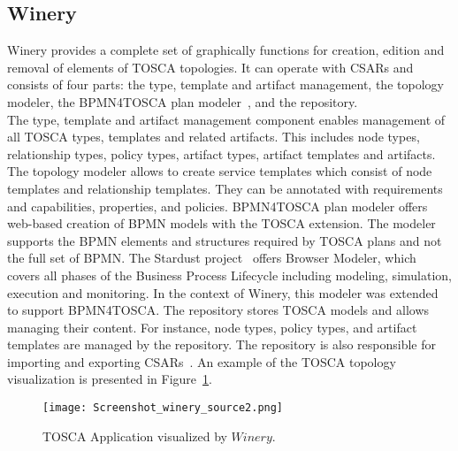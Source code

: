 \subsection*{Winery}\label{subs:wine}\label{tool:winery}
Winery provides a complete set of graphically functions for creation, edition and removal of elements of TOSCA topologies. 
It can operate with CSARs and consists of four parts: the type, template and artifact management, the topology modeler, the BPMN4TOSCA plan modeler~\cite{BPMN4TOSCA}, and the repository.\\
The type, template and artifact management component enables management of all TOSCA types, templates and related artifacts. 
This includes node types, relationship types, policy types, artifact types, artifact templates and artifacts. %
The topology modeler allows to create service templates which consist of node templates and relationship templates. 
They can be annotated with requirements and capabilities, properties, and policies. %
BPMN4TOSCA plan modeler offers web-based creation of BPMN models with the TOSCA extension. 
The modeler supports the BPMN elements and structures required by TOSCA plans and not the full set of BPMN. 
The Stardust project~\cite*{stardust} offers Browser Modeler, which covers all phases of the Business Process Lifecycle including modeling, simulation, execution and monitoring. 
In the context of Winery, this modeler was extended to support BPMN4TOSCA. %
The repository stores TOSCA models and allows managing their content. 
For instance, node types, policy types, and artifact templates are managed by the repository. 
The repository is also responsible for importing and exporting CSARs~\cite{winery}. %
An example of the TOSCA topology visualization is presented in Figure~\ref{fig:winery_source}.
\begin{figure}[ht]   
\centering
\texttt{[image: Screenshot\_winery\_source2.png]}
\caption{TOSCA Application visualized by $Winery$.}
\label{fig:winery_source}
\end{figure}
